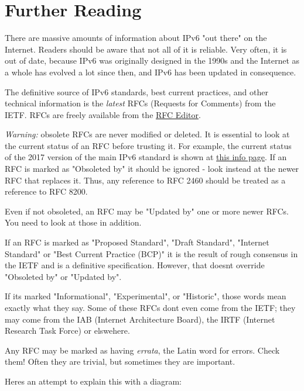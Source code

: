 \documentclass[
]{article}
\begin{document}
\pagebreak

\section{Further Reading}\label{further-reading}

There are massive amounts of information about IPv6 "out there" on the
Internet. Readers should be aware that not all of it is reliable. Very
often, it is out of date, because IPv6 was originally designed in the
1990s and the Internet as a whole has evolved a lot since then, and IPv6
has been updated in consequence.

The definitive source of IPv6 standards, best current practices, and
other technical information is the \emph{latest} RFCs (Requests for
Comments) from the IETF. RFCs are freely available from the
\href{https://www.rfc-editor.org/}{RFC Editor}.

\emph{Warning:} obsolete RFCs are never modified or deleted. It is
essential to look at the current status of an RFC before trusting it.
For example, the current status of the 2017 version of the main IPv6
standard is shown at \href{https://www.rfc-editor.org/info/rfc8200}{this
info page}. If an RFC is marked as "Obsoleted by" it should be ignored -
look instead at the newer RFC that replaces it. Thus, any reference to
RFC 2460 should be treated as a reference to RFC 8200.

Even if not obsoleted, an RFC may be "Updated by" one or more newer
RFCs. You need to look at those in addition.

If an RFC is marked as "Proposed Standard", "Draft Standard", "Internet
Standard" or "Best Current Practice (BCP)" it is the result of rough
consensus in the IETF and is a definitive specification. However, that
doesn\textquotesingle t override "Obsoleted by" or "Updated by".

If it\textquotesingle s marked "Informational", "Experimental", or
"Historic", those words mean exactly what they say. Some of these RFCs
don\textquotesingle t even come from the IETF; they may come from the
IAB (Internet Architecture Board), the IRTF (Internet Research Task
Force) or elswehere.

Any RFC may be marked as having \emph{errata}, the Latin word for
errors. Check them! Often they are trivial, but sometimes they are
important.

Here\textquotesingle s an attempt to explain this with a diagram:
\end{document}
